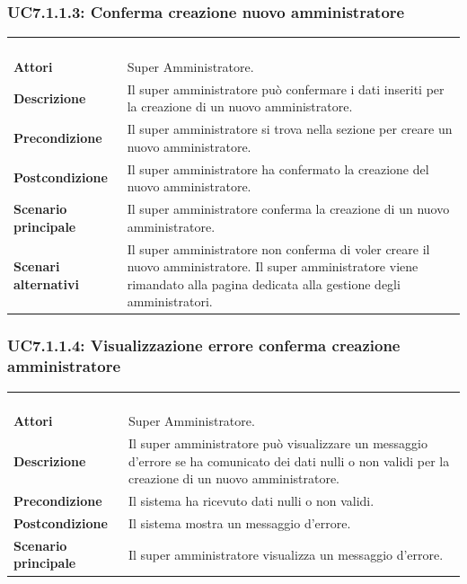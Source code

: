 \subsubsection{UC7.1.1.3: Conferma creazione nuovo amministratore}
\label{UC7.1.1.3}
\begin{longtable}{l|p{10cm}}
\rowcolor[gray]{0.8} \multicolumn{2}{c}{} \\
\rowcolor[gray]{0.8} \multicolumn{2}{c}{\textbf{UC7.1.1.3 - Conferma creazione nuovo amministratore}} \\
\rowcolor[gray]{0.8} \multicolumn{2}{c}{} \\
\hline
&\\
\textbf{Attori} & Super Amministratore.\\[7pt]
\textbf{Descrizione} & Il super amministratore può confermare i dati inseriti per la creazione di un nuovo amministratore.\\[7pt]
\textbf{Precondizione} & Il super amministratore si trova nella sezione per creare un nuovo amministratore. \\[7pt]
\textbf{Postcondizione} & Il super amministratore ha confermato la creazione del nuovo amministratore.\\[7pt]
\textbf{Scenario principale} &Il super amministratore conferma la creazione di un nuovo amministratore.\\[7pt]
\textbf{Scenari alternativi} & Il super amministratore non conferma di voler creare il nuovo amministratore. Il super amministratore viene rimandato alla pagina dedicata alla gestione degli amministratori.\\[7pt]\hline
\end{longtable}

\subsubsection{UC7.1.1.4: Visualizzazione errore conferma creazione amministratore}
\label{UC7.1.1.4}
\begin{longtable}{l|p{10cm}}
\rowcolor[gray]{0.8} \multicolumn{2}{c}{} \\
\rowcolor[gray]{0.8} \multicolumn{2}{c}{\textbf{UC7.1.1.4 - Visualizzazione errore conferma creazione amministratore}} \\
\rowcolor[gray]{0.8} \multicolumn{2}{c}{} \\
\hline
&\\
\textbf{Attori} & Super Amministratore.\\[7pt]
\textbf{Descrizione} & Il super amministratore può visualizzare un messaggio d'errore se ha comunicato dei dati nulli o non validi per la creazione di un nuovo amministratore.\\[7pt]
\textbf{Precondizione} & Il sistema ha ricevuto dati nulli o non validi.\\[7pt]
\textbf{Postcondizione} & Il sistema mostra un messaggio d'errore.\\[7pt]
\textbf{Scenario principale} &Il super amministratore visualizza un messaggio d'errore.\\[7pt]\hline
\end{longtable}

